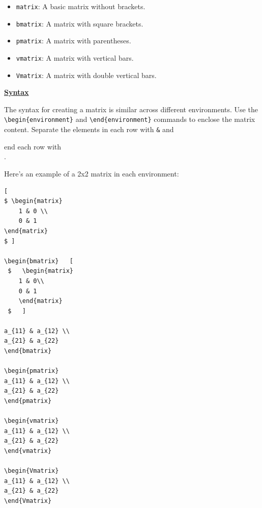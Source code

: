 \documentclass{article}
\begin{document}
\begin{itemize}
  \item \texttt{matrix}: A basic matrix without brackets.
  \item \texttt{bmatrix}: A matrix with square brackets.
  \item \texttt{pmatrix}: A matrix with parentheses.
  \item \texttt{vmatrix}: A matrix with vertical bars.
  \item \texttt{Vmatrix}: A matrix with double vertical bars.
\end{itemize}
\begin{center}
        \item {\textbf{\underline{\LARGE{Syntax}}}}
\end{center}

\LARGE{The syntax for creating a matrix is similar across different environments. Use the \texttt{\textbackslash begin\{environment\}} and \texttt{\textbackslash end\{environment\}} commands to enclose the matrix content. Separate the elements in each row with \texttt{\&} and 

end each row with \texttt{\\}.

Here’s an example of a 2x2 matrix in each environment:}
\begin{verbatim}
[ 
$ \begin{matrix}
    1 & 0 \\
    0 & 1 
\end{matrix}
$ ]

\begin{bmatrix}   [
 $   \begin{matrix}
    1 & 0\\
    0 & 1
    \end{matrix}
 $   ]

a_{11} & a_{12} \\
a_{21} & a_{22}
\end{bmatrix}

\begin{pmatrix}
a_{11} & a_{12} \\
a_{21} & a_{22}
\end{pmatrix}

\begin{vmatrix}
a_{11} & a_{12} \\
a_{21} & a_{22}
\end{vmatrix}

\begin{Vmatrix}
a_{11} & a_{12} \\
a_{21} & a_{22}
\end{Vmatrix}
\end{verbatim}
\end{document}
